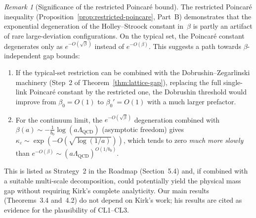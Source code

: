 \documentclass[12pt,a4paper]{article}
\theoremstyle{definition}
\theoremstyle{plain}
\theoremstyle{remark}
\newtheorem{remark}[definition]{Remark}
\begin{document}
\begin{remark}[Significance of the restricted Poincar\'e bound]
\label{rem:restricted-significance}
The restricted Poincar\'e inequality (Proposition~\ref{prop:restricted-poincare}, Part~B) demonstrates that the exponential degeneration of the Holley--Stroock constant in~$\beta$ is partly an artifact of rare large-deviation configurations. On the typical set, the Poincar\'e constant degenerates only as $e^{-O(\sqrt{\beta})}$ instead of $e^{-O(\beta)}$. This suggests a path towards $\beta$-independent gap bounds:

\begin{enumerate}
    \item If the typical-set restriction can be combined with the Dobrushin--Zegarlinski machinery (Step~2 of Theorem~\ref{thm:lattice-gap}), replacing the full single-link Poincar\'e constant by the restricted one, the Dobrushin threshold would improve from $\beta_0 = O(1)$ to $\beta_0' = O(1)$ with a much larger prefactor.
    \item For the continuum limit, the $e^{-O(\sqrt{\beta})}$ degeneration combined with $\beta(a) \sim -\frac{1}{b_0}\log(a\Lambda_{\mathrm{QCD}})$ (asymptotic freedom) gives $\kappa_\varepsilon \sim \exp(-O(\sqrt{\log(1/a)}))$, which tends to zero \emph{much more slowly} than $e^{-O(\beta)} \sim (a\Lambda_{\mathrm{QCD}})^{O(1/b_0)}$.
\end{enumerate}
This is listed as Strategy~2 in the Roadmap (Section~5.4) and, if combined with a suitable multi-scale decomposition, could potentially yield the physical mass gap without requiring Kirk's complete analyticity. Our main results (Theorems~3.4 and~4.2) do not depend on Kirk's work; his results are cited as evidence for the plausibility of CL1--CL3.
\end{remark}
\end{document}
